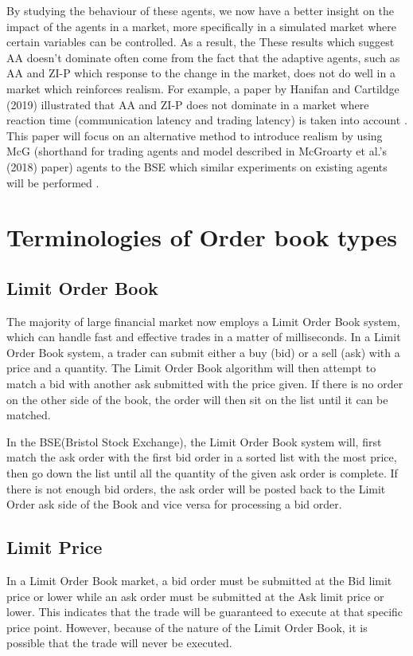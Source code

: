 By studying the behaviour of these agents, we now have a better insight on the impact of the agents in a market, more specifically in a simulated market where certain variables can be controlled. As a result, the These results which suggest AA doesn’t dominate often come from the fact that the adaptive agents, such as AA and ZI-P which response to the change in the market, does not do well in a market which reinforces realism. For example, a paper by Hanifan and Cartildge (2019) illustrated that  AA and ZI-P does not dominate in a market where reaction time (communication latency and trading latency) is taken into account \cite{foolsrush}. This paper will focus on an alternative method to introduce realism by using McG (shorthand for trading agents and model described in McGroarty et al.'s (2018) paper) agents to the BSE which similar experiments on existing agents will be performed \cite{McGroarty}. 

\section{Terminologies of Order book types}
\subsection{Limit Order Book}
The majority of large financial market now employs a Limit Order Book system, which can handle fast and effective trades in a matter of milliseconds. In a Limit Order Book system, a trader can submit either a buy (bid) or a sell (ask) with a price and a quantity. The Limit Order Book algorithm will then attempt to match a bid with another ask submitted with the price given. If there is no order on the other side of the book, the order will then sit on the list until it can be matched. 

In the BSE(Bristol Stock Exchange), the Limit Order Book system will, first match the ask order with the first bid order in a sorted list with the most price, then go down the list until all the quantity of the given ask order is complete. If there is not enough bid orders, the ask order will be posted back to the Limit Order ask side of the Book and vice versa for processing a bid order.

\subsection{Limit Price}
In a Limit Order Book market, a bid order must be submitted at the Bid limit price or lower while an ask order must be submitted at the Ask limit price or lower. This indicates that the trade will be guaranteed to execute at that specific price point. However, because of the nature of the Limit Order Book, it is possible that the trade will never be executed. 

